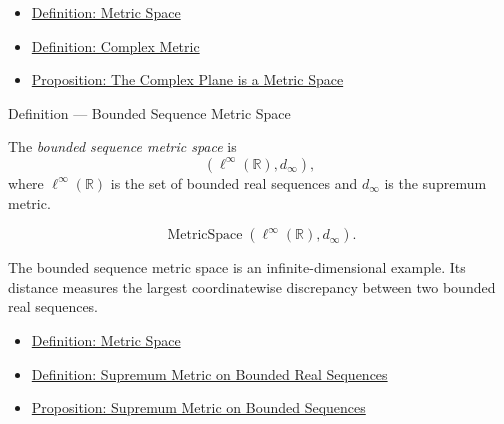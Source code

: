 \begin{dependencies}
\begin{itemize}
  \item \hyperref[def:metric-space]{Definition: Metric Space}
  \item \hyperref[def:complex-metric]{Definition: Complex Metric}
  \item \hyperref[prop:complex-plane-metric-space]{Proposition: The Complex Plane is a Metric Space}
\end{itemize}
\end{dependencies}

\begin{definitionbox}{Definition --- Bounded Sequence Metric Space}
\begin{definition}
\label{def:bounded-sequence-metric-space}
The \emph{bounded sequence metric space} is
\[
  (\ell^\infty(\mathbb{R}),d_\infty),
\]
where \(\ell^\infty(\mathbb{R})\) is the set of bounded real sequences and
\(d_\infty\) is the supremum metric.
\end{definition}
\end{definitionbox}

\begin{remark*}
\[
\operatorname{MetricSpace}(\ell^\infty(\mathbb{R}),d_\infty).
\]
\end{remark*}

\begin{remark*}[Interpretation]
The bounded sequence metric space is an infinite-dimensional example.  Its
distance measures the largest coordinatewise discrepancy between two bounded
real sequences.
\end{remark*}

\begin{dependencies}
\begin{itemize}
  \item \hyperref[def:metric-space]{Definition: Metric Space}
  \item \hyperref[def:bounded-real-sequence-space]{Definition: Supremum Metric on Bounded Real Sequences}
  \item \hyperref[prop:bounded-real-sequence-space-sup-metric]{Proposition: Supremum Metric on Bounded Sequences}
\end{itemize}
\end{dependencies}
